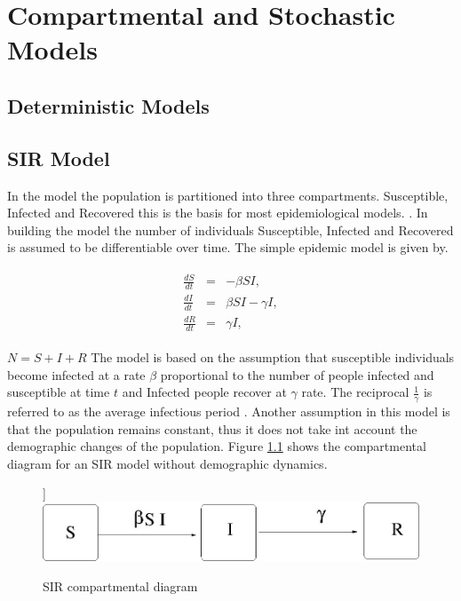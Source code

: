 \chapter{Compartmental and Stochastic Models}
\section{Deterministic Models}

\section{SIR Model}

In the model the population is partitioned into three compartments. Susceptible, Infected and Recovered this is the basis for most epidemiological models. \citep{m1925applications}. In building the model the number of individuals Susceptible, Infected and Recovered is assumed to be differentiable over time.
The simple epidemic model is given by.
\begin{center}
\begin{align} \label{eqn4.1}
\left.\begin{array}{ccl}
\frac{dS}{dt} &= &-\beta SI,\\
 \frac{dI}{dt} &=& \beta S I - \gamma  I, \\
 \frac{dR}{dt} &= &\gamma  I,
\end{array} \right. 
\end{align}
\end{center}

$N = S + I + R$
The model is based on the assumption that susceptible individuals become infected at a rate $\beta$ proportional to the number of people infected and susceptible at time $t$ and Infected people recover at $\gamma$ rate. The reciprocal $\frac{1}{\gamma}$ is referred to as the average infectious period . Another assumption in this model is that the population remains constant, thus it does not take int account the demographic changes of the population. Figure \ref{fig 4.1} shows the compartmental diagram for an SIR model without demographic dynamics.
\begin{figure}[h!]
\caption{SIR compartmental diagram}]\label{fig 4.1}
\centering
\includegraphics[scale=0.5]{images/sir.jpg} 
\end{figure}



